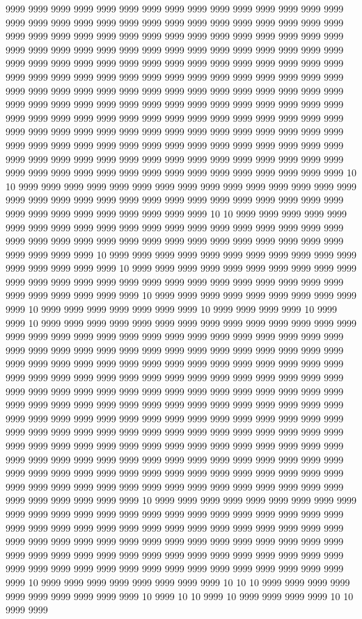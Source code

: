 9999 9999 9999 9999 9999 9999 9999 9999 9999 9999 9999 9999 9999 9999 9999 9999 9999 9999 9999 9999 9999 9999 9999 9999 9999 9999 9999 9999 9999 9999 9999 9999 9999 9999 9999 9999 9999 9999 9999 9999 9999 9999 9999 9999 9999 9999 9999 9999 9999 9999 9999 9999 9999 9999 9999 9999 9999 9999 9999 9999 9999 9999 9999 9999 9999 9999 9999 9999 9999 9999 9999 9999 9999 9999 9999 9999 9999 9999 9999 9999 9999 9999 9999 9999 9999 9999 9999 9999 9999 9999 9999 9999 9999 9999 9999 9999 9999 9999 9999 9999 9999 9999 9999 9999 9999 9999 9999 9999 9999 9999 9999 9999 9999 9999 9999 9999 9999 9999 9999 9999 9999 9999 9999 9999 9999 9999 9999 9999 9999 9999 9999 9999 9999 9999 9999 9999 9999 9999 9999 9999 9999 9999 9999 9999 9999 9999 9999 9999 9999 9999 9999 9999 9999 9999 9999 9999 9999 9999 9999 9999 9999 9999 9999 9999 9999 9999 9999 9999 9999 9999 9999 9999 9999 9999 9999 9999 9999 9999 9999 9999 9999 9999 9999 9999 9999 9999 9999 9999 9999 9999 9999 9999 9999 9999 9999 10 10 9999 9999 9999 9999 9999 9999 9999 9999 9999 9999 9999 9999 9999 9999 9999 9999 9999 9999 9999 9999 9999 9999 9999 9999 9999 9999 9999 9999 9999 9999 9999 9999 9999 9999 9999 9999 9999 9999 9999 10 10 9999 9999 9999 9999 9999 9999 9999 9999 9999 9999 9999 9999 9999 9999 9999 9999 9999 9999 9999 9999 9999 9999 9999 9999 9999 9999 9999 9999 9999 9999 9999 9999 9999 9999 9999 9999 9999 9999 9999 10 9999 9999 9999 9999 9999 9999 9999 9999 9999 9999 9999 9999 9999 9999 9999 9999 10 9999 9999 9999 9999 9999 9999 9999 9999 9999 9999 9999 9999 9999 9999 9999 9999 9999 9999 9999 9999 9999 9999 9999 9999 9999 9999 9999 9999 9999 9999 9999 10 9999 9999 9999 9999 9999 9999 9999 9999 9999 9999 10 9999 9999 9999 9999 9999 9999 9999 10 9999 9999 9999 9999 10 9999 9999 10 9999 9999 9999 9999 9999 9999 9999 9999 9999 9999 9999 9999 9999 9999 9999 9999 9999 9999 9999 9999 9999 9999 9999 9999 9999 9999 9999 9999 9999 9999 9999 9999 9999 9999 9999 9999 9999 9999 9999 9999 9999 9999 9999 9999 9999 9999 9999 9999 9999 9999 9999 9999 9999 9999 9999 9999 9999 9999 9999 9999 9999 9999 9999 9999 9999 9999 9999 9999 9999 9999 9999 9999 9999 9999 9999 9999 9999 9999 9999 9999 9999 9999 9999 9999 9999 9999 9999 9999 9999 9999 9999 9999 9999 9999 9999 9999 9999 9999 9999 9999 9999 9999 9999 9999 9999 9999 9999 9999 9999 9999 9999 9999 9999 9999 9999 9999 9999 9999 9999 9999 9999 9999 9999 9999 9999 9999 9999 9999 9999 9999 9999 9999 9999 9999 9999 9999 9999 9999 9999 9999 9999 9999 9999 9999 9999 9999 9999 9999 9999 9999 9999 9999 9999 9999 9999 9999 9999 9999 9999 9999 9999 9999 9999 9999 9999 9999 9999 9999 9999 9999 9999 9999 9999 9999 9999 9999 9999 9999 9999 9999 9999 9999 9999 9999 9999 9999 9999 9999 9999 9999 9999 9999 9999 9999 9999 9999 9999 9999 9999 9999 10 9999 9999 9999 9999 9999 9999 9999 9999 9999 9999 9999 9999 9999 9999 9999 9999 9999 9999 9999 9999 9999 9999 9999 9999 9999 9999 9999 9999 9999 9999 9999 9999 9999 9999 9999 9999 9999 9999 9999 9999 9999 9999 9999 9999 9999 9999 9999 9999 9999 9999 9999 9999 9999 9999 9999 9999 9999 9999 9999 9999 9999 9999 9999 9999 9999 9999 9999 9999 9999 9999 9999 9999 9999 9999 9999 9999 9999 9999 9999 9999 9999 9999 9999 9999 9999 10 9999 9999 9999 9999 9999 9999 9999 9999 10 10 10 9999 9999 9999 9999 9999 9999 9999 9999 9999 9999 10 9999 10 10 9999 10 9999 9999 9999 9999 10 10 9999 9999 